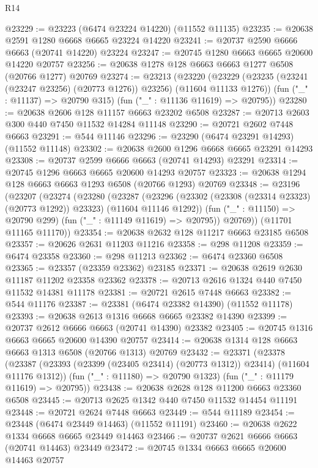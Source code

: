 \begin{lexlean}{R14}
\begin{coremodule}
{{{{{{{{{{{{{{{{{{{{{{{{{{{{{{{{{{{{{{{{{{{{{{{{{{{{{{{{{{{{{{{{{{{{{{{{{{{{{{{{{{@23229 := @23223 (@6474 @23224 @14220) (@11552 @11135)
@23235 := @20638 @2591 @1280 @6668 @6665 @23224 @14220
@23241 := @20737 @2590 @6666 @6663 (@20741 @14220) @23224
@23247 := @20745 @1280 @6663 @6665 @20600 @14220 @20757
@23256 := @20638 @1278 @128 @6663 @6663 @1277 @6508 (@20766 @1277) @20769
@23274 := @23213
    (@23220
      (@23229 (@23235 (@23241 (@23247 @23256) (@20773 @1276)) @23256) (@11604 @11133 @1276))
      (fun ("_" : @11137) => @20790 @315)
      (fun ("_" : @11136 @11619) => @20795))
@23280 := @20638 @2606 @128 @11157 @6663 @23202 @6508
@23287 := @20713 @2603 @300 @440 @7450 @11532 @14284 @11148
@23290 := @20721 @2602 @7448 @6663
@23291 := @544 @11146
@23296 := @23290 (@6474 @23291 @14293) (@11552 @11148)
@23302 := @20638 @2600 @1296 @6668 @6665 @23291 @14293
@23308 := @20737 @2599 @6666 @6663 (@20741 @14293) @23291
@23314 := @20745 @1296 @6663 @6665 @20600 @14293 @20757
@23323 := @20638 @1294 @128 @6663 @6663 @1293 @6508 (@20766 @1293) @20769
@23348 := @23196
    (@23207
      (@23274
        (@23280
          (@23287
            (@23296 (@23302 (@23308 (@23314 @23323) (@20773 @1292)) @23323) (@11604 @11146 @1292))
            (fun ("_" : @11150) => @20790 @299)
            (fun ("_" : @11149 @11619) => @20795))
          @20769))
      (@11701 @11165 @11170))
@23354 := @20638 @2632 @128 @11217 @6663 @23185 @6508
@23357 := @20626 @2631 @11203 @11216
@23358 := @298 @11208
@23359 := @6474 @23358
@23360 := @298 @11213
@23362 := @6474 @23360 @6508
@23365 := @23357 (@23359 @23362) @23185
@23371 := @20638 @2619 @2630 @11187 @11202 @23358 @23362
@23378 := @20713 @2616 @1324 @440 @7450 @11532 @14381 @11178
@23381 := @20721 @2615 @7448 @6663
@23382 := @544 @11176
@23387 := @23381 (@6474 @23382 @14390) (@11552 @11178)
@23393 := @20638 @2613 @1316 @6668 @6665 @23382 @14390
@23399 := @20737 @2612 @6666 @6663 (@20741 @14390) @23382
@23405 := @20745 @1316 @6663 @6665 @20600 @14390 @20757
@23414 := @20638 @1314 @128 @6663 @6663 @1313 @6508 (@20766 @1313) @20769
@23432 := @23371
    (@23378
      (@23387 (@23393 (@23399 (@23405 @23414) (@20773 @1312)) @23414) (@11604 @11176 @1312))
      (fun ("_" : @11180) => @20790 @1323)
      (fun ("_" : @11179 @11619) => @20795))
@23438 := @20638 @2628 @128 @11200 @6663 @23360 @6508
@23445 := @20713 @2625 @1342 @440 @7450 @11532 @14454 @11191
@23448 := @20721 @2624 @7448 @6663
@23449 := @544 @11189
@23454 := @23448 (@6474 @23449 @14463) (@11552 @11191)
@23460 := @20638 @2622 @1334 @6668 @6665 @23449 @14463
@23466 := @20737 @2621 @6666 @6663 (@20741 @14463) @23449
@23472 := @20745 @1334 @6663 @6665 @20600 @14463 @20757
}}}}}}}}}}}}}}}}}}}}}}}}}}}}}}}}}}}}}}}}}}}}}}}}}}}}}}}}}}}}}}}}}}}}}}}}}}}}}}}}}}
\end{coremodule}
\end{lexlean}

